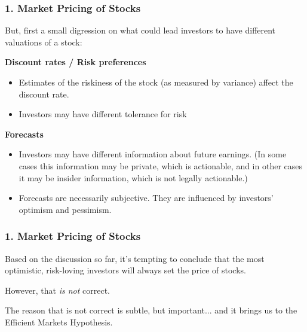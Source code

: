 \documentclass{beamer}
\begin{document}
\begin{frame}[t]
    \frametitle{1. Market Pricing of Stocks}

    But, first a small digression on what could lead investors to have different valuations of a stock:
    \vspace{1em}

    \textbf{Discount rates / Risk preferences}
    \begin{itemize}
        \item Estimates of the riskiness of the stock (as measured by variance) affect the discount rate. 
        \item Investors may have different tolerance for risk
    \end{itemize}
    
    \textbf{Forecasts}
    \begin{itemize}
        \item Investors may have different information about future earnings.   (In some cases this information may be private, which is actionable, and in other cases it may be insider information, which is not legally actionable.)
        \item Forecasts are necessarily subjective.   They are influenced by investors' optimism and pessimism.
    \end{itemize}
    
\end{frame}

\begin{frame}[t]
    \frametitle{1. Market Pricing of Stocks}

    Based on the discussion so far, it’s tempting to conclude that the most optimistic, risk-loving investors will always set the price of stocks.
    \vspace{1em}
    
    However, that \textit{is not} correct.
    \vspace{1em}
    
    The reason that is not correct is subtle, but important... and it brings us to the Efficient Markets Hypothesis.
    
\end{frame}
\end{document}
